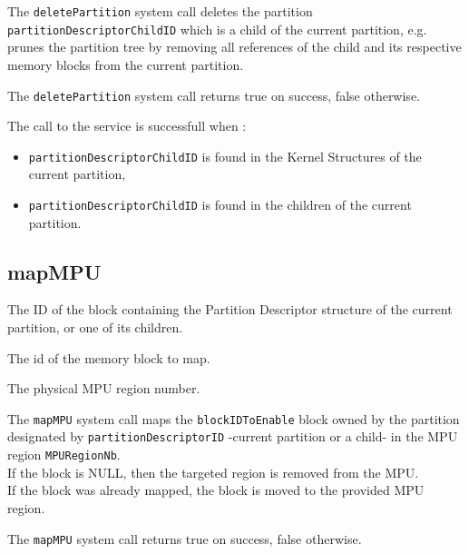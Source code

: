 \documentclass[10pt,a4paper,titlepage]{refart}
\begin{document}
\medskip
The \texttt{deletePartition} system call deletes the partition \texttt{partitionDescriptorChildID}
which is a child of the current partition, e.g. prunes the partition tree by
removing all references of the child and its respective memory blocks from the current partition.

The \texttt{deletePartition} system call returns true on success, false otherwise.

The call to the service is successfull when :
\begin{itemize}
    \item \texttt{partitionDescriptorChildID} is found in the Kernel Structures of the current partition,
    \item \texttt{partitionDescriptorChildID} is found in the children of the current partition.
\end{itemize}

\subsection{mapMPU}
The ID of the block containing the Partition Descriptor structure of the current partition, or one of its children.

The id of the memory block to map.

The physical MPU region number.

\medskip
The \texttt{mapMPU} system call maps the \texttt{blockIDToEnable} block owned by
the partition designated by \texttt{partitionDescriptorID} -current partition or a child- in the MPU region \texttt{MPURegionNb}.\\
If the block is NULL, then the targeted region is removed from the MPU.\\
If the block was already mapped, the block is moved to the provided MPU region.

The \texttt{mapMPU} system call returns true on success, false otherwise.
\end{document}
